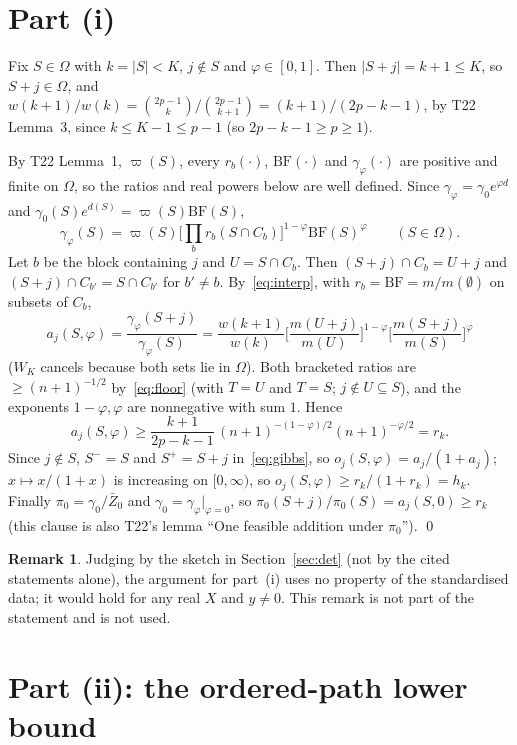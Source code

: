 \documentclass[11pt]{article}
\theoremstyle{definition}
\newtheorem{remark}[theorem]{Remark}
\newcommand{\Om}{\Omega}
\newcommand{\BF}{\mathrm{BF}}
\newcommand{\ph}{\varphi}
\newcommand{\vp}{\varpi}
\begin{document}
\section{Part (i)}

Fix $S\in\Om$ with $k=|S|<K$, $j\notin S$ and $\ph\in[0,1]$. Then $|S+j|=k+1\le K$, so $S+j\in\Om$, and $w(k+1)/w(k)=\binom{2p-1}{k}/\binom{2p-1}{k+1}=(k+1)/(2p-k-1)$, by T22 Lemma~3, since $k\le K-1\le p-1$ (so $2p-k-1\ge p\ge1$).

By T22 Lemma~1, $\vp(S)$, every $r_b(\cdot)$, $\BF(\cdot)$ and $\gamma_\ph(\cdot)$ are positive and finite on $\Om$, so the ratios and real powers below are well defined. Since $\gamma_\ph=\gamma_0e^{\ph d}$ and $\gamma_0(S)e^{d(S)}=\vp(S)\BF(S)$,
\begin{equation}\label{eq:interp}
\gamma_\ph(S)=\vp(S)\Big[\prod_b r_b(S\cap C_b)\Big]^{1-\ph}\BF(S)^{\ph}\qquad(S\in\Om).
\end{equation}
Let $b$ be the block containing $j$ and $U=S\cap C_b$. Then $(S+j)\cap C_b=U+j$ and $(S+j)\cap C_{b'}=S\cap C_{b'}$ for $b'\ne b$. By~\eqref{eq:interp}, with $r_b=\BF=m/m(\emptyset)$ on subsets of $C_b$,
\[
a_j(S,\ph)=\frac{\gamma_\ph(S+j)}{\gamma_\ph(S)}
=\frac{w(k+1)}{w(k)}\Big[\frac{m(U+j)}{m(U)}\Big]^{1-\ph}\Big[\frac{m(S+j)}{m(S)}\Big]^{\ph}
\]
($W_K$ cancels because both sets lie in $\Om$). Both bracketed ratios are $\ge(n+1)^{-1/2}$ by~\eqref{eq:floor} (with $T=U$ and $T=S$; $j\notin U\subseteq S$), and the exponents $1-\ph,\ph$ are nonnegative with sum $1$. Hence
\[
a_j(S,\ph)\ge\frac{k+1}{2p-k-1}\,(n+1)^{-(1-\ph)/2}(n+1)^{-\ph/2}=r_k .
\]
Since $j\notin S$, $S^-=S$ and $S^+=S+j$ in~\eqref{eq:gibbs}, so $o_j(S,\ph)=a_j/(1+a_j)$; $x\mapsto x/(1+x)$ is increasing on $[0,\infty)$, so $o_j(S,\ph)\ge r_k/(1+r_k)=h_k$. Finally $\pi_0=\gamma_0/\bar Z_0$ and $\gamma_0=\gamma_\ph|_{\ph=0}$, so $\pi_0(S+j)/\pi_0(S)=a_j(S,0)\ge r_k$ (this clause is also T22's lemma ``One feasible addition under $\pi_0$''). \qed

\begin{remark}Judging by the sketch in Section~\ref{sec:det} (not by the cited statements alone), the argument for part~(i) uses no property of the standardised data; it would hold for any real $X$ and $y\ne0$. This remark is not part of the statement and is not used.\end{remark}

\section{Part (ii): the ordered-path lower bound}\label{sec:ii}
\end{document}
